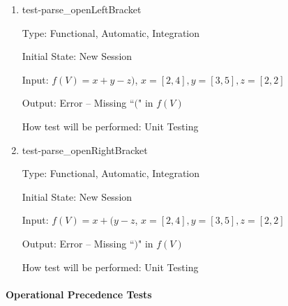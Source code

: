 \documentclass[12pt, titlepage]{article}
\begin{document}
\begin{enumerate}
	
	\item{test-parse\_openLeftBracket}
	
	Type: Functional, Automatic, Integration
	
	Initial State: New Session
	
	Input: $f(V) = x + y - z)$, $x = [2,4], y = [3,5], z = [2,2]$
	
	Output: Error -- Missing ``$($" in $f(V)$
	
	How test will be performed: Unit Testing\\
	
	\item{test-parse\_openRightBracket}
	
	Type: Functional, Automatic, Integration
	
	Initial State: New Session
	
	Input: $f(V) = x + (y - z$, $x = [2,4], y = [3,5], z = [2,2]$
	
	Output: Error -- Missing ``$)$" in $f(V)$
	
	How test will be performed: Unit Testing\\
	
\end{enumerate}

\paragraph{Operational Precedence Tests}
\end{document}
